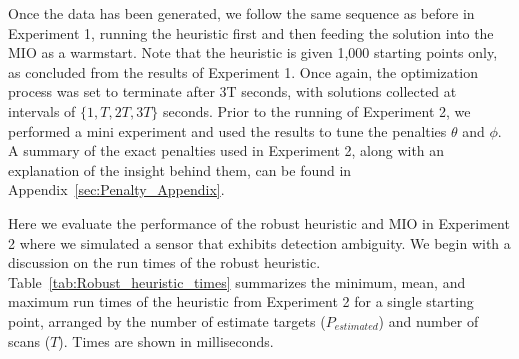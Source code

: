 \documentclass[journal]{IEEEtran}
\begin{document}
Once the data has been generated, we follow the same sequence as before in Experiment 1, running the heuristic first and then feeding the solution into the MIO as a warmstart. Note that the heuristic is given 1,000 starting points only, as concluded from the results of Experiment 1. Once again, the optimization process was set to terminate after 3T seconds, with solutions collected at intervals of $\{1,T,2T,3T\}$ seconds. Prior to the running of Experiment 2, we performed a mini experiment and used the results to tune the penalties $\theta$ and $\phi$. A summary of the exact penalties used in Experiment 2, along with an explanation of the insight behind them, can be found in Appendix~\ref{sec:Penalty_Appendix}. 

Here we evaluate the performance of the robust heuristic and MIO in Experiment 2 where we simulated a sensor that exhibits detection ambiguity. We begin with a discussion on the run times of the robust heuristic. Table~\ref{tab:Robust_heuristic_times} summarizes the minimum, mean, and maximum run times of the heuristic from Experiment 2 for a single starting point, arranged by the number of estimate targets ($P_{estimated}$) and number of scans ($T$). Times are shown in milliseconds. 
\end{document}
